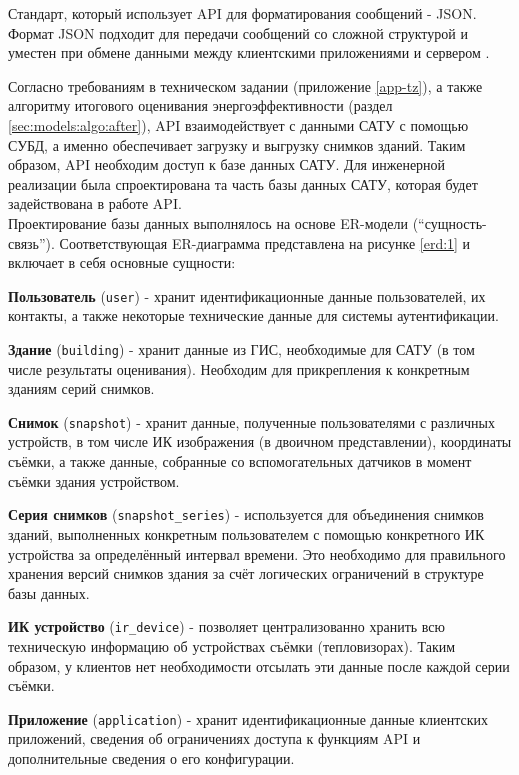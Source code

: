 	Стандарт, который использует API для форматирования сообщений - JSON. Формат JSON подходит для передачи сообщений со сложной структурой и уместен при обмене данными между клиентскими приложениями и сервером \cite{design:json}.
	
	Согласно требованиям в техническом задании (приложение \ref{app-tz}), а также алгоритму итогового оценивания энергоэффективности (раздел \ref{sec:models:algo:after}), API взаимодействует с данными САТУ с помощью СУБД, а именно обеспечивает загрузку и выгрузку снимков зданий. Таким образом, API необходим доступ к базе данных САТУ. Для инженерной реализации была спроектирована та часть базы данных САТУ, которая будет задействована в работе API. \\

	Проектирование базы данных выполнялось на основе ER-модели (“сущность-связь”). Соответствующая ER-диаграмма представлена на рисунке \ref{erd:1} и включает в себя основные сущности:

	\textbf{Пользователь} (\texttt{user}) - хранит идентификационные данные пользователей, их контакты, а также некоторые технические данные для системы аутентификации.

	\textbf{Здание} (\texttt{building}) - хранит данные из ГИС, необходимые для САТУ (в том числе результаты оценивания). Необходим для прикрепления к конкретным зданиям серий снимков.

	\textbf{Снимок} (\texttt{snapshot}) - хранит данные, полученные пользователями с различных устройств, в том числе ИК изображения (в двоичном представлении), координаты съёмки, а также данные, собранные со вспомогательных датчиков в момент съёмки здания устройством.

	\textbf{Серия снимков} (\texttt{snapshot\_series}) - используется для объединения снимков зданий, выполненных конкретным пользователем с помощью конкретного ИК устройства за определённый интервал времени. Это необходимо для правильного хранения версий снимков здания за счёт логических ограничений в структуре базы данных. 

	\textbf{ИК устройство} (\texttt{ir\_device}) - позволяет централизованно хранить всю техническую информацию об устройствах съёмки (тепловизорах). Таким образом, у клиентов нет необходимости отсылать эти данные после каждой серии съёмки.

	\textbf{Приложение} (\texttt{application}) - хранит идентификационные данные клиентских приложений, сведения об ограничениях доступа к функциям API и дополнительные сведения о его конфигурации.

